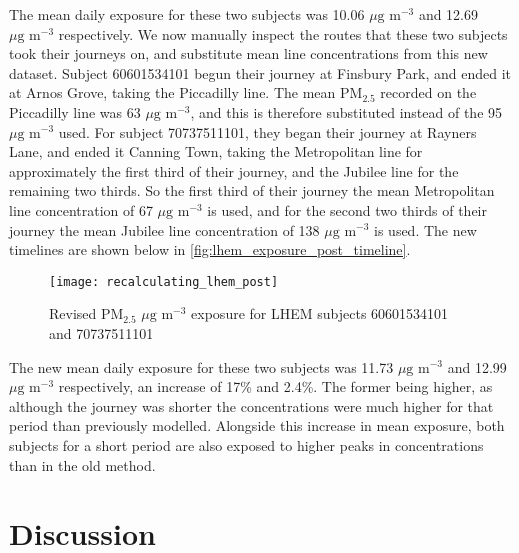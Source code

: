 The mean daily exposure for these two subjects was 10.06 $\mu \text{g m}^{-3}$ and 12.69 $\mu \text{g m}^{-3}$ respectively. We now manually inspect the routes that these two subjects took their journeys on, and substitute mean line concentrations from this new dataset. Subject 60601534101 begun their journey at Finsbury Park, and ended it at Arnos Grove, taking the Piccadilly line. The mean PM$_{2.5}$ recorded on the Piccadilly line was 63 $\mu \text{g m}^{-3}$, and this is therefore substituted instead of the 95 $\mu \text{g m}^{-3}$ used. For subject 70737511101, they began their journey at Rayners Lane, and ended it Canning Town, taking the Metropolitan line for approximately the first third of their journey, and the Jubilee line for the remaining two thirds. So the first third of their journey the mean Metropolitan line concentration of 67 $\mu \text{g m}^{-3}$ is used, and for the second two thirds of their journey the mean Jubilee line concentration of 138 $\mu \text{g m}^{-3}$ is used. The new timelines are shown below in \autoref{fig:lhem_exposure_post_timeline}.

\begin{figure}[H]
\centering
\texttt{[image: recalculating\_lhem\_post]}
\caption{Revised PM$_{2.5}$ $\mu \text{g m}^{-3}$ exposure for LHEM subjects 60601534101 and 70737511101}
\label{fig:lhem_exposure_post_timeline}
\end{figure}

The new mean daily exposure for these two subjects was 11.73 $\mu \text{g m}^{-3}$ and 12.99 $\mu \text{g m}^{-3}$ respectively, an increase of 17\% and 2.4\%. The former being higher, as although the journey was shorter the concentrations were much higher for that period than previously modelled. Alongside this increase in mean exposure, both subjects for a short period are also exposed to higher peaks in concentrations than in the old method.

\section{Discussion}
\label{sec:3Discussion}


